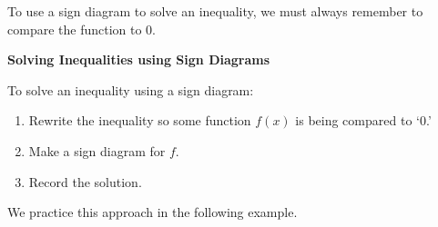 \documentclass{ximera}
\begin{document}
\medskip

To use a sign diagram to solve an inequality, we must always remember to compare the function to $0$.

\medskip

\colorbox{ResultColor}{\bbm

\centerline{\textbf{Solving Inequalities using Sign Diagrams}} 

\smallskip

To solve an inequality using a sign diagram:

\begin{enumerate}

\item  Rewrite the inequality so some function $f(x)$ is being compared to `$0$.'

\item  Make a sign diagram for $f$.

\item  Record the solution.

\end{enumerate}

\ebm}

\medskip

We practice this approach in the following example.
\end{document}
